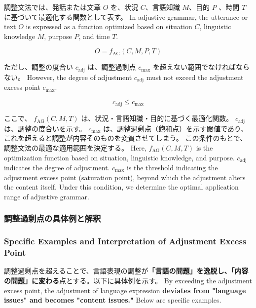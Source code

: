 \documentclass[a4paper,xelatex,ja=standard]{bxjsarticle}
\begin{document}
\ifJPN
調整文法では、発話または文章 $O$ を、状況 $C$、言語知識 $M$、目的 $P$ 、時間 $T$ に基づいて最適化する関数として表す。
\else
In adjustive grammar, the utterance or text \( O \) is expressed as a function optimized based on situation \( C \), linguistic knowledge \( M \), purpose \( P \), and time \( T \).
\fi

\begin{equation}
    O = f_{\text{AG}}(C, M, P, T)
\end{equation}

\ifJPN
ただし、調整の度合い $c_{\text{adj}}$ は、調整過剰点 $c_{\text{max}}$ を超えない範囲でなければならない。
\else
  However, the degree of adjustment \( c_{\text{adj}} \) must not exceed the adjustment excess point \( c_{\text{max}} \).
\fi

\begin{equation}
    c_{\text{adj}} \leq c_{\text{max}}
\end{equation}

\ifJPN
ここで、
$f_{\text{AG}}(C, M, T)$ は、状況・言語知識・目的に基づく最適化関数。
$c_{\text{adj}}$ は、調整の度合いを示す。
$c_{\text{max}}$ は、調整過剰点（飽和点）を示す閾値であり、これを超えると調整が内容そのものを変質させてしまう。
この条件のもとで、調整文法の最適な適用範囲を決定する。
\else
  Here, \( f_{\text{AG}}(C, M, T) \) is the optimization function based on situation, linguistic knowledge, and purpose.
  \( c_{\text{adj}} \) indicates the degree of adjustment.
  \( c_{\text{max}} \) is the threshold indicating the adjustment excess point (saturation point), beyond which the adjustment alters the content itself.
  Under this condition, we determine the optimal application range of adjustive grammar.
\fi

\ifJPN
\subsubsection{調整過剰点の具体例と解釈}
\else
  \subsubsection{Specific Examples and Interpretation of Adjustment Excess Point}
\fi

\ifJPN
調整過剰点を超えることで、言語表現の調整が\textbf{「言語の問題」を逸脱し、「内容の問題」に変わる}点とする。以下に具体例を示す。
\else
  By exceeding the adjustment excess point, the adjustment of language expression \textbf{deviates from "language issues" and becomes "content issues."} Below are specific examples.
\fi
\end{document}
